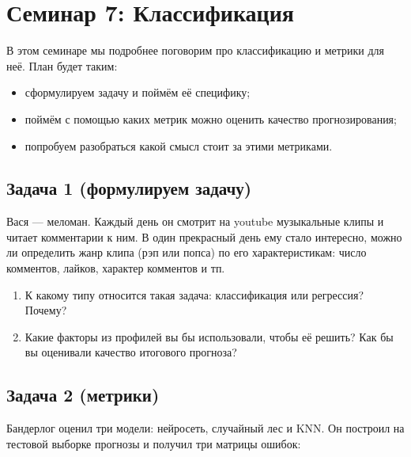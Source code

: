\documentclass[12pt, a4paper, oneside]{article}
\begin{document}
\section*{Семинар 7:  Классификация}

В этом семинаре мы подробнее поговорим про классификацию и метрики для неё. План будет таким: 

\begin{itemize}
	\item сформулируем задачу и поймём её специфику;
	\item поймём с помощью каких метрик можно оценить качество прогнозирования;
	\item попробуем разобраться какой смысл стоит за этими метриками.
\end{itemize}



\subsection*{Задача 1 (формулируем задачу)}

Вася --- меломан. Каждый день он смотрит на youtube музыкальные клипы и читает комментарии к ним. В один прекрасный день ему стало интересно, можно ли определить жанр клипа (рэп или попса) по его характеристикам: число комментов, лайков, характер комментов и тп. 

\begin{enumerate}
	\item К какому типу относится такая задача: классификация или регрессия? Почему? 
	
	\item Какие факторы из профилей вы бы использовали, чтобы её решить? Как бы вы оценивали качество итогового прогноза?
\end{enumerate}


\subsection*{Задача 2 (метрики)}

Бандерлог оценил три модели: нейросеть, случайный лес и KNN.  Он построил на тестовой выборке прогнозы и получил три матрицы ошибок: 
\end{document}
